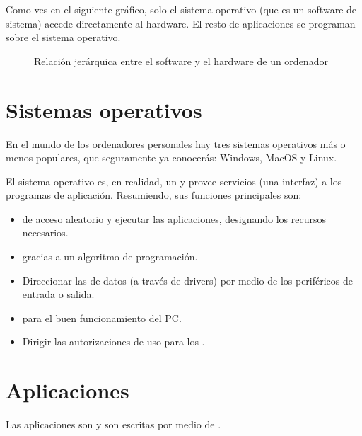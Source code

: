 \documentclass[letterpaper,10pt,spanish]{sphinxmanual}
\begin{document}
\sphinxAtStartPar
Como ves en el siguiente gráfico, solo el sistema operativo (que es un software de sistema) accede directamente al hardware. El resto de aplicaciones se programan sobre el sistema operativo.

\begin{figure}[htbp]
\centering
\capstart

\noindent{}
\caption{Relación jerárquica entre el software y el hardware de un ordenador}\label{\detokenize{relacion_sw_hw:id1}}\end{figure}


\section{Sistemas operativos}
\label{\detokenize{relacion_sw_hw:sistemas-operativos}}
\sphinxAtStartPar
En el mundo de los ordenadores personales hay tres sistemas operativos más o menos populares, que seguramente ya conocerás: Windows, MacOS y Linux.

\sphinxAtStartPar
El sistema operativo es, en realidad, un  y provee servicios (una interfaz) a los programas de aplicación. Resumiendo, sus funciones principales son:
\begin{itemize}
\item {} 
\sphinxAtStartPar
{} de acceso aleatorio y ejecutar las aplicaciones, designando los recursos necesarios.

\item {} 
\sphinxAtStartPar
{} gracias a un algoritmo de programación.

\item {} 
\sphinxAtStartPar
Direccionar las  de datos (a través de drivers) por medio de los periféricos de entrada o salida.

\item {} 
\sphinxAtStartPar
{} para el buen funcionamiento del PC.

\item {} 
\sphinxAtStartPar
Dirigir las autorizaciones de uso para los .

\end{itemize}


\section{Aplicaciones}
\label{\detokenize{relacion_sw_hw:aplicaciones}}
\sphinxAtStartPar
Las aplicaciones son  y son escritas por medio de .
\end{document}
